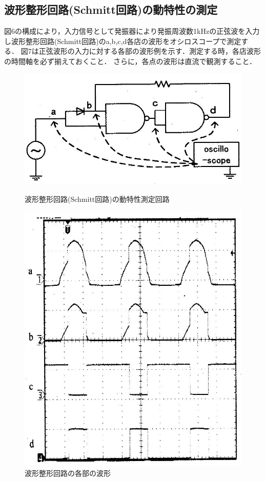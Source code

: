 \documentclass[10pt, a4j, dvipdfmx]{jarticle}
\begin{document}
\subsection{波形整形回路(Schmitt回路)の動特性の測定}
図6の構成により，入力信号として発振器により発振周波数1kHzの正弦波を入力し波形整形回路(Schmitt回路)のa,b,c,d各店の波形をオシロスコープで測定する．
図7は正弦波形の入力に対する各部の波形例を示す．測定する時，各店波形の時間軸を必ず揃えておくこと．
さらに，各点の波形は直流で観測すること．
\begin{figure}[H]
  \begin{minipage}{0.5\hsize}
    \centering
   	\includegraphics[width=\hsize]{images/text/fig6.png}
    \caption{波形整形回路(Schmitt回路)の動特性測定回路}
  \end{minipage}
  \begin{minipage}{0.5\hsize}
    \centering
	\includegraphics[width=\hsize]{images/text/fig7.png}
    \caption{波形整形回路の各部の波形}
  \end{minipage}
\end{figure}
\end{document}
